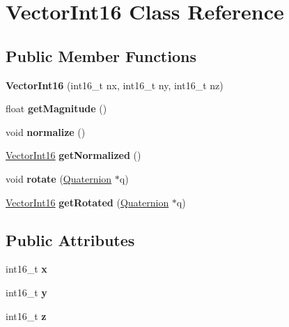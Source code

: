 \hypertarget{classVectorInt16}{}\section{Vector\+Int16 Class Reference}
\label{classVectorInt16}
\subsection*{Public Member Functions}
\begin{DoxyCompactItemize}
\item 
\mbox{\label{classVectorInt16_acce45f37b3f90df1d5aff6edbf12f02b}} 
{\bfseries Vector\+Int16} (int16\+\_\+t nx, int16\+\_\+t ny, int16\+\_\+t nz)
\item 
\mbox{\label{classVectorInt16_aeb8087ac5732450bc18ac944a16d0694}} 
float {\bfseries get\+Magnitude} ()
\item 
\mbox{\label{classVectorInt16_aefdadb30fbc20b564bbbf0b1a885e349}} 
void {\bfseries normalize} ()
\item 
\mbox{\label{classVectorInt16_a1f2c17ac660f1e90a095f9e7914200c5}} 
\mbox{\hyperlink{classVectorInt16}{Vector\+Int16}} {\bfseries get\+Normalized} ()
\item 
\mbox{\label{classVectorInt16_ac7bf149db0a2b66d7683b87ebeb2dfc5}} 
void {\bfseries rotate} (\mbox{\hyperlink{classQuaternion}{Quaternion}} $\ast$q)
\item 
\mbox{\label{classVectorInt16_a9e1d9f4553b069bf353e807f130a285b}} 
\mbox{\hyperlink{classVectorInt16}{Vector\+Int16}} {\bfseries get\+Rotated} (\mbox{\hyperlink{classQuaternion}{Quaternion}} $\ast$q)
\end{DoxyCompactItemize}
\subsection*{Public Attributes}
\begin{DoxyCompactItemize}
\item 
\mbox{\label{classVectorInt16_a648435b4c99e9da9c95549ac344beaec}} 
int16\+\_\+t {\bfseries x}
\item 
\mbox{\label{classVectorInt16_a5d340e1f1bcbc064e5084ca609a6a6a3}} 
int16\+\_\+t {\bfseries y}
\item 
\mbox{\label{classVectorInt16_af1b5c4c297bdd32751ab4519480b919f}} 
int16\+\_\+t {\bfseries z}
\end{DoxyCompactItemize}


